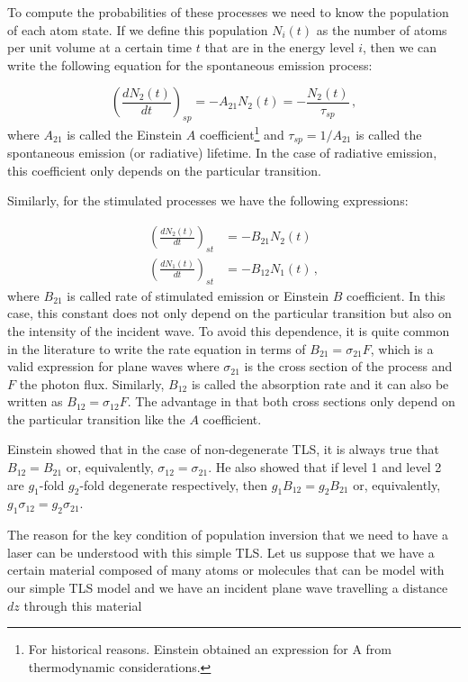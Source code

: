 \documentclass[11pt,a4paper]{article}
\begin{document}
To compute the probabilities of these processes we need to know the population of each atom state. If we define this population $N_i(t)$ as the number of atoms per unit volume at a certain time $t$ that are in the energy level $i$, then we can write the following equation for the spontaneous emission process:

\begin{equation}\label{eq:spontaneous_emission}
\left(\frac{dN_2(t)}{dt}\right)_{sp}=-A_{21}N_2(t)=-\frac{N_2(t)}{\tau_{sp}}\,,
\end{equation}
where $A_{21}$ is called the Einstein $A$ coefficient\footnote{For historical reasons. Einstein obtained an expression for A from thermodynamic considerations.} and $\tau_{sp}=1/A_{21}$ is called the spontaneous emission (or radiative) lifetime. In the case of radiative emission, this coefficient only depends on the particular transition.

Similarly, for the stimulated processes we have the following expressions:

\begin{align}\label{eq:stimulated_emission}
\left(\frac{dN_2(t)}{dt}\right)_{st}&=-B_{21}N_2(t)\\ \label{eq:absorption}
\left(\frac{dN_1(t)}{dt}\right)_{st}&=-B_{12}N_1(t)\,,
\end{align}
where $B_{21}$ is called rate of stimulated emission or Einstein $B$ coefficient. In this case, this constant does not only depend on the particular transition but also on the intensity of the incident wave. To avoid this dependence, it is quite common in the literature to write the rate equation in terms of $B_{21}=\sigma_{21}F$, which is a valid expression for plane waves where $\sigma_{21}$ is the cross section of the process and $F$ the photon flux. Similarly, $B_{12}$ is called the absorption rate and it can also be written as $B_{12}=\sigma_{12}F$. The advantage in that both cross sections only depend on the particular transition like the $A$ coefficient.

Einstein showed that in the case of non-degenerate TLS, it is always true that $B_{12}=B_{21}$ or, equivalently,  $\sigma_{12}=\sigma_{21}$. He also showed that if level 1 and level 2 are $g_1$-fold $g_2$-fold degenerate respectively, then $g_1B_{12}=g_2B_{21}$ or, equivalently, $g_1\sigma_{12}=g_2\sigma_{21}$.

The reason for the key condition of population inversion that we need to have a laser can be understood with this simple TLS. Let us suppose that we have a certain material composed of many atoms or molecules that can be model with our simple TLS model and we have an incident plane wave travelling a distance $dz$ through this material
\end{document}
